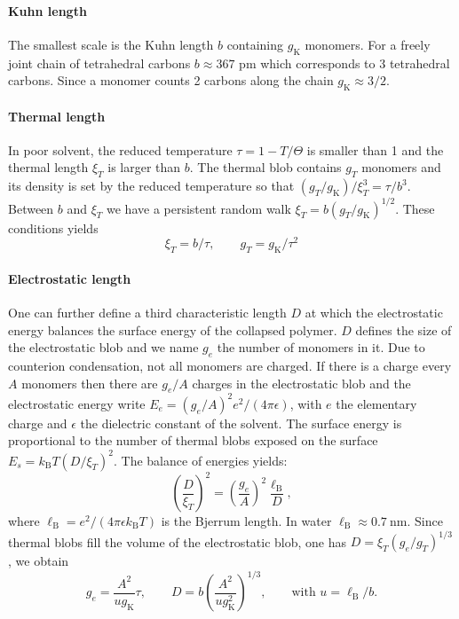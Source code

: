 \documentclass[journal=jacsat,manuscript=article]{achemso}
\begin{document}
\paragraph{Kuhn length}
The smallest scale is the Kuhn length $b$ containing $g_\mathrm{K}$ monomers. For a freely joint chain of tetrahedral carbons $b\approx 367$ pm which corresponds to 3 tetrahedral carbons. Since a monomer counts 2 carbons along the chain $g_\mathrm{K}\approx 3/2$.

\paragraph{Thermal length}
In poor solvent, the reduced temperature $\tau = 1 -T/\Theta$ is smaller than 1 and the thermal length $\xi_T$ is larger than $b$. The thermal blob contains $g_T$ monomers and its density is set by the reduced temperature so that $(g_T/g_\mathrm{K})/\xi_T^3 = \tau/b^3$. Between $b$ and $\xi_T$ we have a persistent random walk $\xi_T = b (g_T/g_\mathrm{K})^{1/2}$. These conditions yields 
\begin{equation}
\xi_T = b/\tau,\qquad g_T = g_\mathrm{K}/\tau^2
\label{eq:thermal}
\end{equation}

\paragraph{Electrostatic length}
One can further define a third characteristic length $D$ at which the electrostatic energy balances the surface energy of the collapsed polymer. $D$ defines the size of the electrostatic blob and we name $g_e$ the number of monomers in it. Due to counterion condensation, not all monomers are charged. If there is a charge every $A$ monomers then there are $g_e/A$ charges in the electrostatic blob and the electrostatic energy write $E_e = (g_e/A)^2 e^2/(4\pi\epsilon)$, with $e$ the elementary charge and $\epsilon$ the dielectric constant of the solvent. The surface energy is proportional to the number of thermal blobs exposed on the surface $E_s = k_\mathrm{B}T (D/\xi_T)^2$. The balance of energies yields:
\begin{equation}\left(\frac{D}{\xi_T}\right)^2 = \left(\frac{g_e}{A}\right)^2 \frac{\ell_\mathrm{B}}{D},
\label{eq:electrosurface}
\end{equation}
where $\ell_\mathrm{B} = e^2/(4\pi\epsilon k_\mathrm{B}T)$ is the Bjerrum length. In water $\ell_\mathrm{B} \approx \SI{0.7}{\nano\metre}$. Since thermal blobs fill the volume of the electrostatic blob, one has $D = \xi_T \left(g_e/g_T\right)^{1/3}$, we obtain
\begin{equation}
g_e = \frac{A^2}{u g_\mathrm{K}} \tau, \qquad D = b\left(\frac{A^2}{u g_\mathrm{K}^2}\right)^{1/3},\qquad \text{with }u = \ell_\mathrm{B}/b.
\label{eq:geD}
\end{equation}
\end{document}
